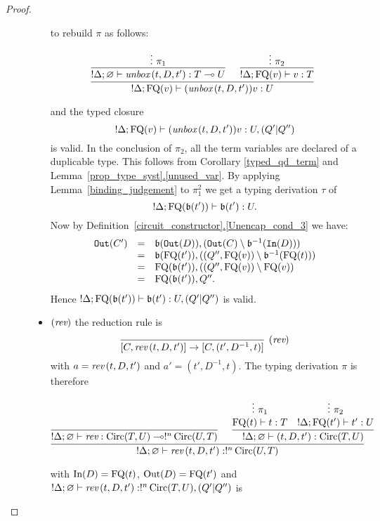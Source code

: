 \documentclass[twoside]{article}
\begin{document}
\begin{proof}
\begin{description}
\begin{itemize}
  to rebuild $\pi$ as follows:
  \begin{footnotesize}
  \[
  \infer[]{!\Delta; \FQ(v)\entails (\unbox\,(t,D,t'))v :U}{
    \infer[]{!\Delta;\varnothing\entails \unbox\,(t,D,t'):T\loli U}{
      \vdots~\pi_1            
    }
    &
    \infer[]{!\Delta ; \FQ(v)\entails v:T}{
      \vdots~\pi_2
    }
  }
  \]
  \end{footnotesize} 
  and the typed closure
  \[
  !\Delta; \mathop{\textrm{FQ}}\nolimits(v) \vdash (\mathop{\textit{unbox}}\nolimits\,(t,D,t'))v :U,(Q'|Q'')
  \] 
  is valid. In the conclusion of $\pi_2$, all the 
  term variables are declared of a duplicable type. This 
  follows from Corollary \ref{typed_qd_term} and 
  Lemma~\hyperref[unused_var]{\ref*{prop_type_syst}.\ref*{unused_var}}. 
  By applying Lemma~\hyperref[binding_judgement]{\ref*{binding_judgement}} 
  to $\pi_1^2$ we get a typing derivation $\tau$ of 
  \[
  !\Delta;\mathop{\textrm{FQ}}\nolimits(\mathfrak{b}(t'))\vdash \mathfrak{b}(t'):U.
  \]
  Now by 
  Definition~\hyperref[Unencap_cond_3]{\ref*{circuit_constructor}.\ref*{Unencap_cond_3}} 
  we have:
  \[
  \begin{array}{rcl}
  \mathtt{Out}(C') & = & \mathfrak{b}(\mathtt{Out}(D)), (\mathtt{Out}(C)\setminus\mathfrak{b}^{-1}(\mathtt{In}(D))) \\
                   & = & \mathfrak{b}(\mathop{\textrm{FQ}}\nolimits(t')) , ((Q'',\mathop{\textrm{FQ}}\nolimits(v))\setminus \mathfrak{b}^{-1}(\mathop{\textrm{FQ}}\nolimits(t))) \\
                   & = & \mathop{\textrm{FQ}}\nolimits(\mathfrak{b}(t')) , ((Q'',\mathop{\textrm{FQ}}\nolimits(v))\setminus \mathop{\textrm{FQ}}\nolimits(v)) \\
                   & = & \mathop{\textrm{FQ}}\nolimits(\mathfrak{b}(t')),Q''.                   
  \end{array}
  \]
  Hence $!\Delta; \mathop{\textrm{FQ}}\nolimits(\mathfrak{b}(t'))\vdash \mathfrak{b}(t') :U,(Q'|Q'')$  is valid.
  \item $(\mathop{\textit{rev}}\nolimits)$ the reduction rule is
  \[
    \infer[(\rev)]{[C,\rev\,(t,D,t')]\to [C,(t',D^{-1},t)]}{}
  \]
  with $a=\mathop{\textit{rev}}\nolimits\,(t,D,t')$ and $a'=(t',D^{-1},t)$. The typing derivation $\pi$ 
  is therefore
  \begin{footnotesize}
  \[
  \infer[]{!\Delta;\varnothing\entails \rev\,(t,D,t'):!^n\Circ(U,T)}{
    \infer[]{!\Delta;\varnothing \entails \rev:\Circ(T,U)\loli !^n\Circ(U,T)}{
    }   
    &
    \infer[]{!\Delta ;\varnothing\entails (t,D,t'):\Circ(T,U)}{
      \deduce[]{\FQ(t)\entails t:T}{
        \vdots ~\pi_1
      }
      &
      \deduce[]{!\Delta;\FQ(t')\entails t':U}{
        \vdots ~\pi_2     
      }
    }
  }
  \]
  \end{footnotesize}  
  with $\mathop{\textrm{In}}\nolimits(D)=\mathop{\textrm{FQ}}\nolimits(t)$, $\mathop{\textrm{Out}}\nolimits(D)=\mathop{\textrm{FQ}}\nolimits(t')$ and 
  $!\Delta;\varnothing\vdash \mathop{\textit{rev}}\nolimits\,(t,D,t'):!^n\mathop{\textrm{Circ}}\nolimits(T,U),(Q'|Q'')$ is 

\end{itemize}
\end{description}
\end{proof}
\end{document}
